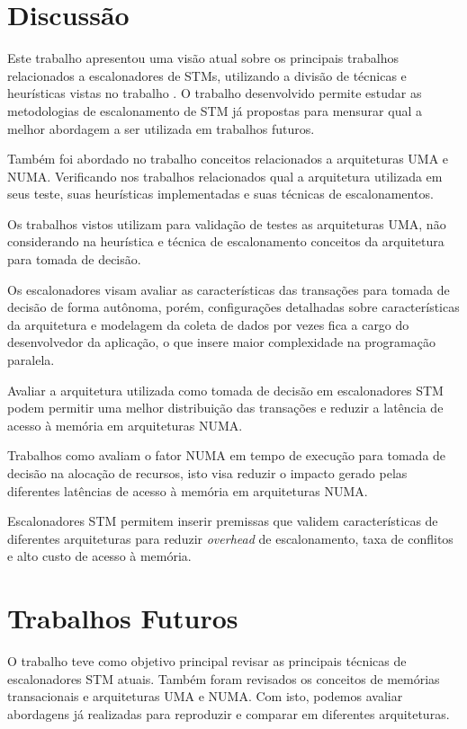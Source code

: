 \documentclass[ti]{texufpel}
\begin{document}
\section{Discussão}

Este trabalho apresentou uma visão atual sobre os principais trabalhos relacionados a escalonadores de STMs, utilizando a divisão de técnicas e heurísticas vistas no trabalho \cite{sanzo17}. O trabalho desenvolvido permite estudar as metodologias de escalonamento de STM já propostas para mensurar qual a melhor abordagem a ser utilizada em trabalhos futuros.

Também foi abordado no trabalho conceitos relacionados a arquiteturas UMA e NUMA. Verificando nos trabalhos relacionados qual a arquitetura utilizada em seus teste, suas heurísticas implementadas e suas técnicas de escalonamentos.

Os trabalhos vistos utilizam para validação de testes as arquiteturas UMA, não considerando na heurística e técnica de escalonamento conceitos da arquitetura para tomada de decisão.

Os escalonadores visam avaliar as características das transações para tomada de decisão de forma autônoma, porém, configurações detalhadas sobre características da arquitetura e modelagem da coleta de dados por vezes fica a cargo do desenvolvedor da aplicação, o que insere maior complexidade na programação paralela.

Avaliar a arquitetura utilizada como tomada de decisão em escalonadores STM podem permitir uma melhor distribuição das transações e reduzir a latência de acesso à memória em arquiteturas NUMA.

Trabalhos como \cite{rodolfo14} avaliam o fator NUMA em tempo de execução para tomada de decisão na alocação de recursos, isto visa reduzir o impacto gerado pelas diferentes latências de acesso à memória em arquiteturas NUMA.

Escalonadores STM permitem inserir premissas que validem características de diferentes arquiteturas para reduzir \emph{overhead} de escalonamento, taxa de conflitos e alto custo de acesso à memória.

\section{Trabalhos Futuros}

O trabalho teve como objetivo principal revisar as principais técnicas de escalonadores STM atuais. Também foram revisados os conceitos de memórias transacionais e arquiteturas UMA e NUMA. Com isto, podemos avaliar abordagens já realizadas para reproduzir e comparar em diferentes arquiteturas.
\end{document}
